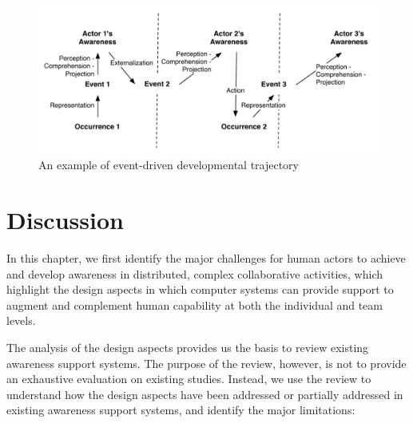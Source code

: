 \begin{figure}[htbp] %
   \centering
   \includegraphics[width=4.5in]{example_awareness_traj.pdf} 
   \caption{An example of event-driven developmental trajectory}
   \label{fig:example_awareness_traj}
\end{figure}

\section{Discussion} %
\label{sec:discussion}
In this chapter, we first identify the major challenges for human actors to achieve and develop awareness in distributed, complex collaborative activities, which highlight the design aspects in which computer systems can provide support to augment and complement human capability at both the individual and team levels. 

The analysis of the design aspects provides us the basis to review existing awareness support systems. The purpose of the review, however, is not to provide an exhaustive evaluation on existing studies. Instead, we use the review to understand how the design aspects have been addressed or partially addressed in existing awareness support systems, and identify the major limitations:

